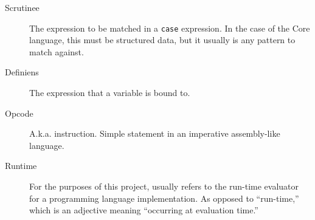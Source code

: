 \begin{description}
\item[Scrutinee] The expression to be matched in a \texttt{case} expression. In the case of the Core language, this must be structured data, but it usually is any pattern to match against.
\item[Definiens] The expression that a variable is bound to.
\item[Opcode] A.k.a. instruction. Simple statement in an imperative assembly-like language.
\item[Runtime] For the purposes of this project, usually refers to the run-time evaluator for a programming language implementation. As opposed to ``run-time,'' which is an adjective meaning ``occurring at evaluation time.''
\end{description}

